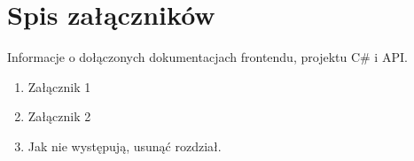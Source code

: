 \documentclass[a4paper,11pt,twoside]{report}
\theoremstyle{definition}
\begin{document}

\chapter*{Spis załączników}

Informacje o dołączonych dokumentacjach frontendu, projektu C\# i API.

\begin{enumerate}
\item Załącznik 1
\item Załącznik 2
\item Jak nie występują, usunąć rozdział.
\end{enumerate}
\thispagestyle{empty}
\end{document}

